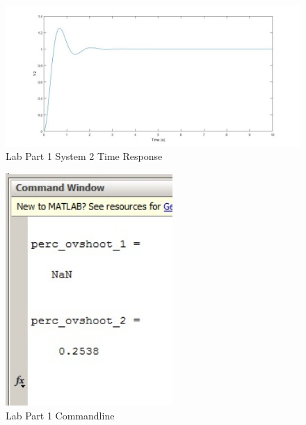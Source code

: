 \documentclass[12pt]{article}
\begin{document}
\begin{figure}[h!] %
   \centering
   \includegraphics[width=\linewidth]{time_response_system_2.jpg} 
   \caption{Lab Part 1 System 2 Time Response}
   \label{fig:example}
\end{figure}
\bigskip

\newpage

\begin{figure}[h!] %
   \centering
   \includegraphics[width=2.5in]{part_1_commandline.jpg} 
   \caption{Lab Part 1 Commandline}
   \label{fig:example}
\end{figure}
\bigskip
\bigskip
\end{document}
